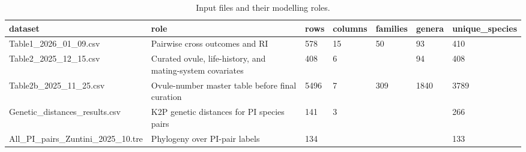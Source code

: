 \begin{table}
\caption{Input files and their modelling roles.}
\label{tab:dataset_inventory}
\begin{adjustbox}{max width=\textwidth}
\begin{tabular}{lllllll}
\toprule
dataset & role & rows & columns & families & genera & unique\_species \\
\midrule
Table1\_2026\_01\_09.csv & Pairwise cross outcomes and RI & 578 & 15 & 50 & 93 & 410 \\
Table2\_2025\_12\_15.csv & Curated ovule, life-history, and mating-system covariates & 408 & 6 &  & 94 & 408 \\
Table2b\_2025\_11\_25.csv & Ovule-number master table before final curation & 5496 & 7 & 309 & 1840 & 3789 \\
Genetic\_distances\_results.csv & K2P genetic distances for PI species pairs & 141 & 3 &  &  & 266 \\
All\_PI\_pairs\_Zuntini\_2025\_10.tre & Phylogeny over PI-pair labels & 134 &  &  &  & 133 \\
\bottomrule
\end{tabular}
\end{adjustbox}
\end{table}
